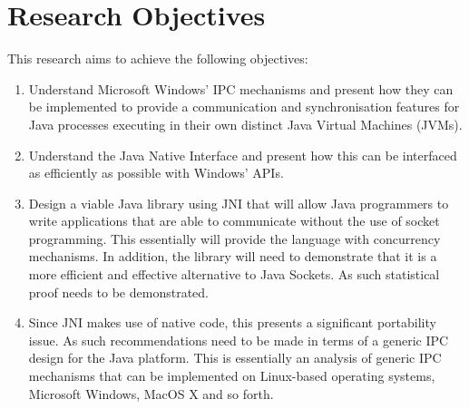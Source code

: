\documentclass[12pt] {newrucsthesis}    %
\begin{document}
    \section{Research Objectives} \label{researchobjectives}
      This research aims to achieve the following objectives:
      \begin{enumerate}
        \item Understand Microsoft Windows' IPC mechanisms and present how they can be implemented to provide a communication
              and synchronisation features for Java processes executing in their own distinct Java Virtual Machines (JVMs).

        \item Understand the Java Native Interface and present how this can be interfaced as efficiently as possible with
              Windows' APIs.

        \item Design a viable Java library using JNI that will allow Java programmers to write applications that are able to
              communicate without the use of socket programming. This essentially will provide the
              language with concurrency mechanisms. In addition, the library will need to demonstrate that
              it is a more efficient and effective alternative to Java Sockets. As such statistical proof needs to be
              demonstrated.

        \item Since JNI makes use of native code, this presents a significant portability issue. As such recommendations
              need to be made in terms of a generic IPC design for the Java platform. This is essentially an analysis of
              generic IPC mechanisms that can be implemented on Linux-based operating systems, Microsoft Windows, MacOS X
              and so forth.
      \end{enumerate}
\end{document}

